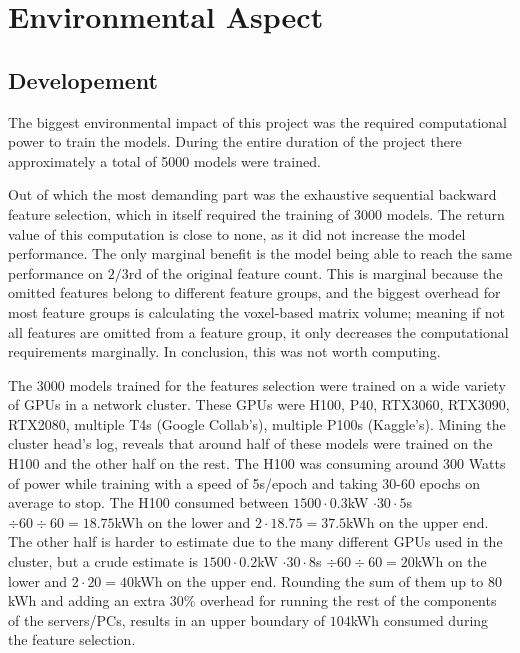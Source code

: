 \section{Environmental Aspect}

\subsection{Developement}

The biggest environmental impact of this project was the required computational power to train the models. During the entire duration of the project there approximately a total of 5000 models were trained.\par
Out of which the most demanding part was the exhaustive sequential backward feature selection, which in itself required the training of 3000 models. The return value of this computation is close to none, as it did not increase the model performance. The only marginal benefit is the model being able to reach the same performance on $2/3$rd of the original feature count. This is marginal because the omitted features belong to different feature groups, and the biggest overhead for most feature groups is calculating the voxel-based matrix volume; meaning if not all features are omitted from a feature group, it only decreases the computational requirements marginally. In conclusion, this was not worth computing.\par
The 3000 models trained for the features selection were trained on a wide variety of GPUs in a network cluster. These GPUs were H100, P40, RTX3060, RTX3090, RTX2080, multiple T4s (Google Collab's), multiple P100s (Kaggle's). Mining the cluster head's log, reveals that around half of these models were trained on the H100 and the other half on the rest. The H100 was consuming around 300 Watts of power while training with a speed of 5s/epoch and taking 30-60 epochs on average to stop. The H100 consumed between $1500 \cdot 0.3$kW $ \cdot 30 \cdot 5$s $ \div 60 \div 60 = 18.75$kWh on the lower and $2 \cdot 18.75 = 37.5$kWh on the upper end. The other half is harder to estimate due to the many different GPUs used in the cluster, but a crude estimate is $1500 \cdot 0.2$kW $ \cdot 30 \cdot 8$s $ \div 60 \div 60 = 20$kWh on the lower and $2 \cdot 20 = 40$kWh on the upper end. Rounding the sum of them up to $80$kWh and adding an extra $30\%$ overhead for running the rest of the components of the servers/PCs, results in an upper boundary of $104$kWh consumed during the feature selection.\par
